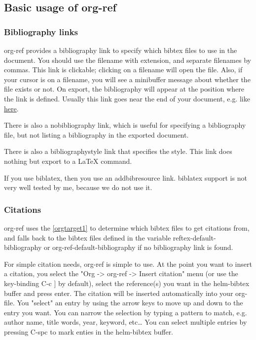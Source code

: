 \documentclass[11pt]{article}
\begin{document}
\subsection{Basic usage of org-ref}
\label{sec:orgheadline8}

\subsubsection{Bibliography links}
\label{sec:orgheadline2}
 

org-ref provides a bibliography link to specify which bibtex files to use in the document. You should use the filename with extension, and separate filenames by commas. This link is clickable; clicking on a filename will open the file. Also, if your cursor is on a filename, you will see a minibuffer message about whether the file exists or not. On export, the bibliography will appear at the position where the link is defined. Usually this link goes near the end of your document, e.g. like \hyperref[orgtarget1]{here}.

There is also a nobibliography link, which is useful for specifying a bibliography file, but not listing a bibliography in the exported document.

There is also a bibliographystyle link that specifies the style. This link does nothing but export to a \LaTeX{} command.

If you use biblatex, then you use an addbibresource link. biblatex support is not very well tested by me, because we do not use it.

\subsubsection{Citations}
\label{sec:orgheadline3}

org-ref uses the \ref{orgtarget1} to determine which bibtex files to get citations from, and falls back to the bibtex files defined in the variable  reftex-default-bibliography or org-ref-default-bibliography if no bibliography link is found.

For simple citation needs, org-ref is simple to use. At the point you want to insert a citation, you select the "Org -> org-ref -> Insert citation" menu (or use the key-binding C-c ] by default), select the reference(s) you want in the helm-bibtex buffer and press enter. The citation will be inserted automatically into your org-file. You "select" an entry by using the arrow keys to move up and down to the entry you want. You can narrow the selection by typing a pattern to match, e.g. author name, title words, year, keyword, etc\ldots{} You can select multiple entries by pressing C-spc to mark enties in the helm-bibtex buffer.
\end{document}
